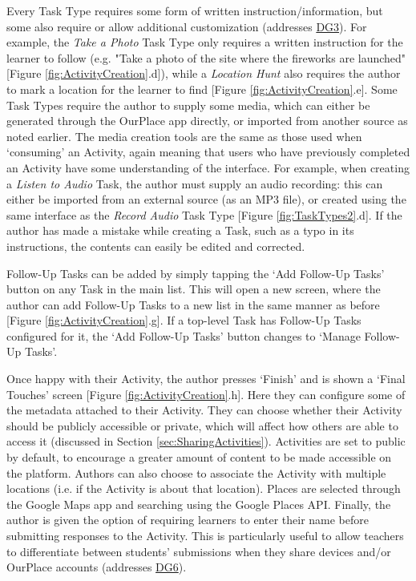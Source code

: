 Every Task Type requires some form of written instruction/information, but some also require or allow additional customization (addresses \hyperref[DG3]{DG3}). For example, the \textit{Take a Photo} Task Type only requires a written instruction for the learner to follow (e.g. "Take a photo of the site where the fireworks are launched" [Figure \ref{fig:ActivityCreation}.d]), while a \textit{Location Hunt} also requires the author to mark a location for the learner to find [Figure \ref{fig:ActivityCreation}.e]. Some Task Types require the author to supply some media, which can either be generated through the OurPlace app directly, or imported from another source as noted earlier. The media creation tools are the same as those used when `consuming' an Activity, again meaning that users who have previously completed an Activity have some understanding of the interface. For example, when creating a \textit{Listen to Audio} Task, the author must supply an audio recording: this can either be imported from an external source (as an MP3 file), or created using the same interface as the \textit{Record Audio} Task Type [Figure \ref{fig:TaskTypes2}.d]. If the author has made a mistake while creating a Task, such as a typo in its instructions, the contents can easily be edited and corrected.

Follow-Up Tasks can be added by simply tapping the `Add Follow-Up Tasks' button on any Task in the main list. This will open a new screen, where the author can add Follow-Up Tasks to a new list in the same manner as before [Figure \ref{fig:ActivityCreation}.g]. If a top-level Task has Follow-Up Tasks configured for it, the `Add Follow-Up Tasks' button changes to `Manage Follow-Up Tasks'.

Once happy with their Activity, the author presses `Finish' and is shown a `Final Touches' screen [Figure \ref{fig:ActivityCreation}.h]. Here they can configure some of the metadata attached to their Activity. They can choose whether their Activity should be publicly accessible or private, which will affect how others are able to access it (discussed in Section \ref{sec:SharingActivities}). Activities are set to public by default, to encourage a greater amount of content to be made accessible on the platform. Authors can also choose to associate the Activity with multiple locations (i.e. if the Activity is about that location). Places are selected through the Google Maps app and searching using the Google Places API. Finally, the author is given the option of requiring learners to enter their name before submitting responses to the Activity. This is particularly useful to allow teachers to differentiate between students' submissions when they share devices and/or OurPlace accounts (addresses \hyperref[DG6]{DG6}).

